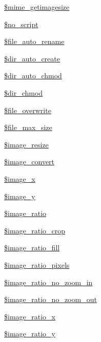 \begin{DoxyCompactItemize}
\hyperlink{classupload_a2aebfb2c520c7418d1ff6e0fe33d7503}{\$mime\+\_\+getimagesize}
\item 
\hyperlink{classupload_a6db6ac031ae8b2607c989d8af5055c6d}{\$no\+\_\+script}
\item 
\hyperlink{classupload_a26ee644c62bc2b0770f065d27ab35d7b}{\$file\+\_\+auto\+\_\+rename}
\item 
\hyperlink{classupload_a0a7dd2c40dd6033694bdd11262fcdbcd}{\$dir\+\_\+auto\+\_\+create}
\item 
\hyperlink{classupload_aa1ebf408cb0a515c3ef771247aff50c9}{\$dir\+\_\+auto\+\_\+chmod}
\item 
\hyperlink{classupload_a4806807317fe01ff7d88f268f7b75773}{\$dir\+\_\+chmod}
\item 
\hyperlink{classupload_a2060ec0240ec35d80156513f6633db5f}{\$file\+\_\+overwrite}
\item 
\hyperlink{classupload_a2b86820e12c263b13feb90dba91dc0aa}{\$file\+\_\+max\+\_\+size}
\item 
\hyperlink{classupload_aaffa33a7cbc2802a97b4cd476f4bb17a}{\$image\+\_\+resize}
\item 
\hyperlink{classupload_a26a41d90be8b9299072aa1d82571c81a}{\$image\+\_\+convert}
\item 
\hyperlink{classupload_a64ae4d4b6b494f0ed48a0fbe19058491}{\$image\+\_\+x}
\item 
\hyperlink{classupload_a741c488d4e608823b3e000dcf4fd90db}{\$image\+\_\+y}
\item 
\hyperlink{classupload_a8aa9c007d7fe55244da93c464c33d3e1}{\$image\+\_\+ratio}
\item 
\hyperlink{classupload_a20047343d42089dcff74e9c91ac3a21a}{\$image\+\_\+ratio\+\_\+crop}
\item 
\hyperlink{classupload_adb7eb11acb14f451c3227a3fa2031a96}{\$image\+\_\+ratio\+\_\+fill}
\item 
\hyperlink{classupload_a3fe87d1029a23b3d85fd14031104d578}{\$image\+\_\+ratio\+\_\+pixels}
\item 
\hyperlink{classupload_a501c2b60a2b05ee6af9aa3366569bff3}{\$image\+\_\+ratio\+\_\+no\+\_\+zoom\+\_\+in}
\item 
\hyperlink{classupload_a262a57cf7b91c1e9656c9931b9f69ba7}{\$image\+\_\+ratio\+\_\+no\+\_\+zoom\+\_\+out}
\item 
\hyperlink{classupload_a2bbf61549f9a2762b9d5fbd4d2714a8d}{\$image\+\_\+ratio\+\_\+x}
\item 
\hyperlink{classupload_a066000c0ea76d68b723a4cc9a0085945}{\$image\+\_\+ratio\+\_\+y}
\item 

\end{DoxyCompactItemize}
